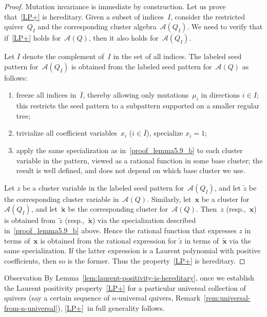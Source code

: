 \documentclass[ALCO,ThmDefs,Unicode,epreuves,published]{cedram}
\newenvironment{observation}{\begin{enonce}{Observation}}{\end{enonce}}
\begin{document}
\begin{proof}
Mutation invariance is immediate by construction. Let us prove that~\ref{LP+} is hereditary. Given a subset of indices~$I$, consider the restricted quiver~$Q_I$ and the corresponding cluster algebra~$\mathcal{A}(Q_I)$. We need to verify that if~\ref{LP+} holds for~$\mathcal{A}(Q)$, then it also holds for~$\mathcal{A}(Q_I)$. 

Let $\overline I$ denote the complement of~$I$ in the set of all indices. The labeled seed pattern for~$\mathcal{A}(Q_I)$ is obtained from the labeled seed pattern for~$\mathcal{A}(Q)$ as follows: 
\begin{enumerate}[label=(\alph*)]
\item\label{proof_lemma5.9_a} %
freeze all indices in~$\overline I$, thereby allowing only mutations~$\mu_i$ in directions $i\in I$; this restricts the seed pattern to a subpattern supported on a smaller regular tree; 
\item\label{proof_lemma5.9_b} %
trivialize all coefficient variables~$x_i$ ($i\in\overline I$), \ie specialize $x_i=1$;
\item\label{proof_lemma5.9_c} %
apply the same specialization as in~\ref{proof_lemma5.9_b} to each cluster variable in the pattern, viewed as a rational function in some base cluster; the result is well defined, and does not depend on which base cluster we use. 
\end{enumerate}
Let $z$ be a cluster variable in the labeled seed pattern for~$\mathcal{A}(Q_I)$, and let $\tilde z$ be the corresponding cluster variable in~$\mathcal{A}(Q)$. Similarly, let~$\mathbf{x}$ be a cluster for~$\mathcal{A}(Q_I)$, and let~$\mathbf{\tilde x}$ be the corresponding cluster for~$\mathcal{A}(Q)$. 
Then~$z$ (resp.,~$\mathbf{x}$) is obtained from~$\tilde z$ (resp.,~$\mathbf{\tilde x}$) via the specialization described in~\ref{proof_lemma5.9_b} above. 
Hence the rational function that expresses $z$ in terms of~$\mathbf{x}$ is obtained from the rational expression for $\tilde z$ in terms of~$\mathbf{\tilde x}$ via the same specialization. If the latter expression is a Laurent polynomial with positive coefficients, then so is the former. Thus the property~\ref{LP+} is hereditary. 
\end{proof}

\begin{observation}
{%
By Lemma~\ref{lem:laurent-positivity-is-hereditary}, once we establish the Laurent positivity property~\ref{LP+} for a particular universal collection of quivers (say a certain sequence of $n$-universal quivers, \cf Remark~\ref{rem:universal-from-n-universal}), \ref{LP+}~in full generality follows. 
}
\end{observation}
\end{document}
